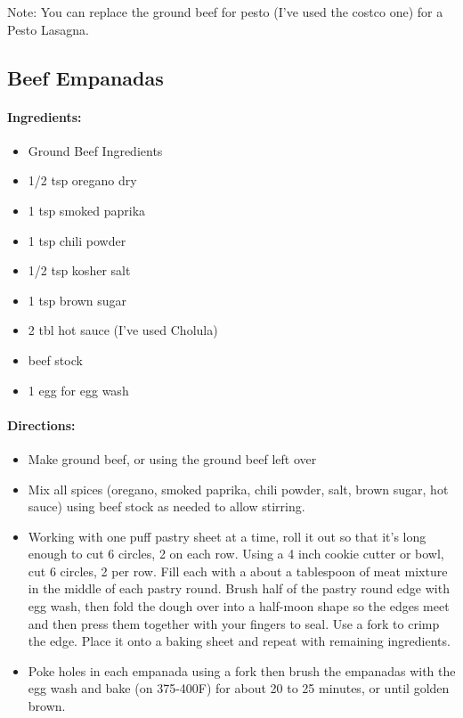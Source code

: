 \documentclass{article}
\begin{document}
Note: You can replace the ground beef for pesto (I’ve used the costco one) for a Pesto Lasagna.

\subsection{Beef Empanadas}
\paragraph{Ingredients:}
\begin{itemize}
  \item Ground Beef Ingredients
  \item 1/2 tsp oregano dry
  \item 1 tsp smoked paprika
  \item 1 tsp chili powder
  \item 1/2 tsp kosher salt
  \item 1 tsp brown sugar
  \item 2 tbl hot sauce (I’ve used Cholula)
  \item beef stock
  \item 1 egg for egg wash
\end{itemize}

\paragraph{Directions:}
\begin{itemize}
  \item Make ground beef, or using the ground beef left over
  \item Mix all spices (oregano, smoked paprika, chili powder, salt, brown sugar, hot sauce) using beef
stock as needed to allow stirring.
  \item Working with one puff pastry sheet at a time, roll it out so that it’s long enough to cut 6 circles, 2 on each
row. Using a 4 inch cookie cutter or bowl, cut 6 circles, 2 per row. Fill each with a about a tablespoon
of meat mixture in the middle of each pastry round. Brush half of the pastry round edge with egg wash,
then fold the dough over into a half-moon shape so the edges meet and then press them together with
your fingers to seal. Use a fork to crimp the edge. Place it onto a baking sheet and repeat with remaining
ingredients.
  \item Poke holes in each empanada using a fork then brush the empanadas with the egg wash and bake (on 375-400F) for about 20 to 25 minutes, or until golden brown.
\end{itemize}
\end{document}
